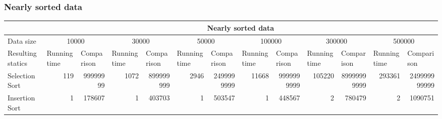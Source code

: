 \documentclass{article}
\begin{document}
\subsubsection{Nearly sorted data}
\begin{table}[H]
\begin{adjustbox}{width=\columnwidth,center}
\begin{tabular}{|l|rrrrrrrrrrrr|}
\hline
                  & \multicolumn{12}{c|}{Nearly sorted data}                                                                                                                                                                                                                                                                                                                                                                                           \\ \hline
Data size         & \multicolumn{2}{c|}{10000}                                          & \multicolumn{2}{c|}{30000}                                          & \multicolumn{2}{c|}{50000}                                          & \multicolumn{2}{c|}{100000}                                         & \multicolumn{2}{c|}{300000}                                          & \multicolumn{2}{c|}{500000}                                         \\ \hline
Resulting statics & \multicolumn{1}{l|}{Running time} & \multicolumn{1}{l|}{Comparison} & \multicolumn{1}{l|}{Running time} & \multicolumn{1}{l|}{Comparison} & \multicolumn{1}{l|}{Running time} & \multicolumn{1}{l|}{Comparison} & \multicolumn{1}{l|}{Running time} & \multicolumn{1}{l|}{Comparison} & \multicolumn{1}{l|}{Running time} & \multicolumn{1}{l|}{Comparison}  & \multicolumn{1}{l|}{Running time} & \multicolumn{1}{l|}{Comparison} \\ \hline
Selection Sort    & \multicolumn{1}{r|}{119}          & \multicolumn{1}{r|}{99999999}   & \multicolumn{1}{r|}{1072}         & \multicolumn{1}{r|}{899999999}  & \multicolumn{1}{r|}{2946}         & \multicolumn{1}{r|}{2499999999} & \multicolumn{1}{r|}{11668}        & \multicolumn{1}{r|}{9999999999} & \multicolumn{1}{r|}{105220}       & \multicolumn{1}{r|}{89999999999} & \multicolumn{1}{r|}{293361}       & 249999999999                    \\ \hline
Insertion Sort    & \multicolumn{1}{r|}{1}            & \multicolumn{1}{r|}{178607}     & \multicolumn{1}{r|}{1}            & \multicolumn{1}{r|}{403703}     & \multicolumn{1}{r|}{1}            & \multicolumn{1}{r|}{503547}     & \multicolumn{1}{r|}{1}            & \multicolumn{1}{r|}{448567}     & \multicolumn{1}{r|}{2}            & \multicolumn{1}{r|}{780479}      & \multicolumn{1}{r|}{2}            & 1090751                         \\ \hline

\end{tabular}
\end{adjustbox}
\end{table}
\end{document}
